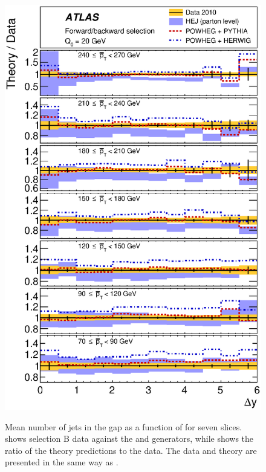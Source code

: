 \begin{figure}[htpb]
{    \includegraphics[width=\smallfigwidth]{chapters/gbj/Njet_YDist_gap_Q0_sel_B_Ratio.eps}
    \label{fig:gbj:N_jets_dY_B_ratio}}
  \caption{Mean number of jets in the gap as a function of \DeltaY for seven \pTbar
           slices. \protect{} shows selection
           B data against the \HEJ and \Powheg generators, while \protect{}
           shows the ratio of the theory predictions to the data. The data and theory
           are presented in the same way as .}
  \label{fig:gbj:N_jets_dY_B}
\end{figure}

